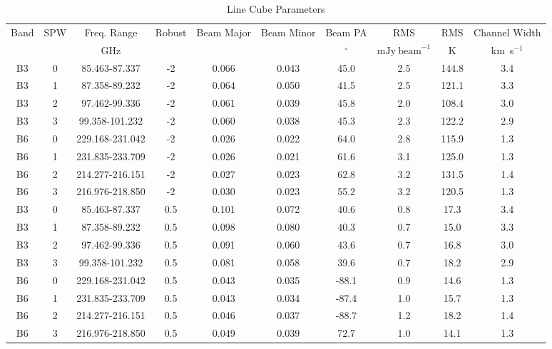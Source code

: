\documentclass[twocolumn]{aastex61}
\let\oldarcsec\arcsec
\renewcommand\arcsec{\oldarcsec\xspace}%
\newcommand{\kms}{\textrm{km~s}\ensuremath{^{-1}}\xspace}	%
\begin{document}
\begin{table}[htp]
\centering
\caption{Line Cube Parameters}
\begin{tabular}{cccccccccc}
\label{tab:cube_metadata}
Band & SPW & Freq. Range & Robust & Beam Major & Beam Minor & Beam PA               & RMS                               & RMS & Channel Width\\
     &     & GHz         &        & \arcsec    & \arcsec    & $\mathrm{{}^{\circ}}$ & $\mathrm{mJy}~\mathrm{beam}^{-1}$ & K   & \kms         \\
\hline

B3 & 0 & 85.463-87.337 & -2 & 0.066 & 0.043 & 45.0 & 2.5 & 144.8 & 3.4\\
B3 & 1 & 87.358-89.232 & -2 & 0.064 & 0.050 & 41.5 & 2.5 & 121.1 & 3.3\\
B3 & 2 & 97.462-99.336 & -2 & 0.061 & 0.039 & 45.8 & 2.0 & 108.4 & 3.0\\
B3 & 3 & 99.358-101.232 & -2 & 0.060 & 0.038 & 45.3 & 2.3 & 122.2 & 2.9\\
B6 & 0 & 229.168-231.042 & -2 & 0.026 & 0.022 & 64.0 & 2.8 & 115.9 & 1.3\\
B6 & 1 & 231.835-233.709 & -2 & 0.026 & 0.021 & 61.6 & 3.1 & 125.0 & 1.3\\
B6 & 2 & 214.277-216.151 & -2 & 0.027 & 0.023 & 62.8 & 3.2 & 131.5 & 1.4\\
B6 & 3 & 216.976-218.850 & -2 & 0.030 & 0.023 & 55.2 & 3.2 & 120.5 & 1.3\\
B3 & 0 & 85.463-87.337 & 0.5 & 0.101 & 0.072 & 40.6 & 0.8 & 17.3 & 3.4\\
B3 & 1 & 87.358-89.232 & 0.5 & 0.098 & 0.080 & 40.3 & 0.7 & 15.0 & 3.3\\
B3 & 2 & 97.462-99.336 & 0.5 & 0.091 & 0.060 & 43.6 & 0.7 & 16.8 & 3.0\\
B3 & 3 & 99.358-101.232 & 0.5 & 0.081 & 0.058 & 39.6 & 0.7 & 18.2 & 2.9\\
B6 & 0 & 229.168-231.042 & 0.5 & 0.043 & 0.035 & -88.1 & 0.9 & 14.6 & 1.3\\
B6 & 1 & 231.835-233.709 & 0.5 & 0.043 & 0.034 & -87.4 & 1.0 & 15.7 & 1.3\\
B6 & 2 & 214.277-216.151 & 0.5 & 0.046 & 0.037 & -88.7 & 1.2 & 18.2 & 1.4\\
B6 & 3 & 216.976-218.850 & 0.5 & 0.049 & 0.039 & 72.7 & 1.0 & 14.1 & 1.3\\

\hline
\end{tabular}

\end{table}
 
\end{document}
